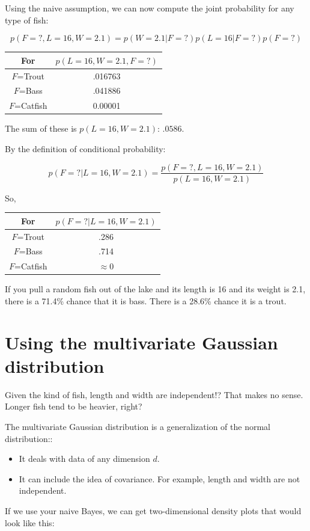 Using the naive assumption, we can now compute the joint probability for any type of fish: 

$$p(F=?, L=16 , W=2.1) = p(W=2.1 | F=?) p(L=16 | F=?)p(F=?)$$

\begin{tabular}{c | c }
For & $p(L=16, W=2.1, F=?)$ \\
\hline
$F$=Trout & .016763\\
$F$=Bass &  .041886  \\
$F$=Catfish  &  0.00001\\
\end{tabular}

The sum of these is $p(L=16, W=2.1)$: $.0586$.

By the definition of conditional probability:

$$p(F=? | L=16, W=2.1) = \frac{p(F=?, L=16, W=2.1) }{p(L=16, W=2.1)}$$

So,

\begin{tabular}{c | c }
For & $p(F=? | L=16, W=2.1)$ \\
\hline
$F$=Trout & .286\\
$F$=Bass &  .714  \\
$F$=Catfish  &  $\approx 0$\\
\end{tabular}

If you pull a random fish out of the lake and its length is 16 and its weight is 2.1, there is a 71.4\% chance that it is bass.  There is a 28.6\% chance it is a trout.

\section{Using the multivariate Gaussian distribution}

Given the kind of fish, length and width are independent!?  That makes no sense.  Longer fish tend to be heavier, right?

The multivariate Gaussian distribution is a generalization of the normal distribution::
\begin{itemize}
\item It deals with data of any dimension $d$.
\item It can include the idea of covariance. For example, length and width are not independent.
\end{itemize}

If we use your naive Bayes,  we can get two-dimensional density plots that would look like this:

